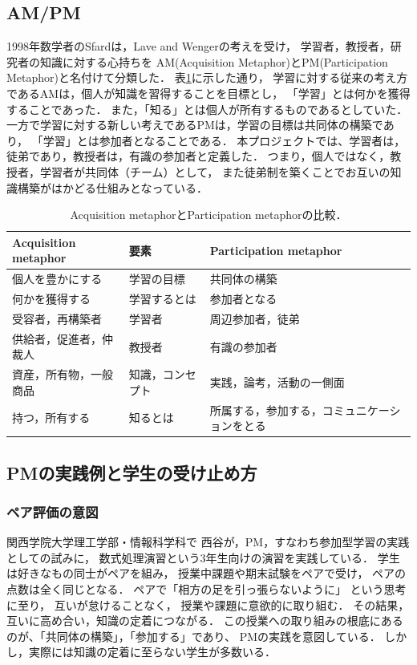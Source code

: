 \documentclass{hissymp}
\begin{document}
\subsection{AM/PM}
\label{sec:org652756e}
1998年数学者のSfardは，Lave and Wengerの考えを受け，
学習者，教授者，研究者の知識に対する心持ちを
AM(Acquisition Metaphor)とPM(Participation Metaphor)と名付けて分類した\cite{Sfard}．
表\ref{tab:org52578cd}に示した通り，
学習に対する従来の考え方であるAMは，個人が知識を習得することを目標とし，
「学習」とは何かを獲得することであった．
また，「知る」とは個人が所有するものであるとしていた．
一方で学習に対する新しい考えであるPMは，学習の目標は共同体の構築であり，
「学習」とは参加者となることである．
本プロジェクトでは、学習者は，徒弟であり，教授者は，有識の参加者と定義した．
つまり，個人ではなく，教授者，学習者が共同体（チーム）として，
また徒弟制を築くことでお互いの知識構築がはかどる仕組みとなっている．

\begin{table}[bt]
\caption{\label{tab:org52578cd}
Acquisition metaphorとParticipation metaphorの比較．}
\centering
\begin{tabular}{lll}
\hline
Acquisition metaphor & 要素 & Participation metaphor\\
\hline
個人を豊かにする & 学習の目標 & 共同体の構築\\
何かを獲得する & 学習するとは & 参加者となる\\
受容者，再構築者 & 学習者 & 周辺参加者，徒弟\\
供給者，促進者，仲裁人 & 教授者 & 有識の参加者\\
資産，所有物，一般商品 & 知識，コンセプト & 実践，論考，活動の一側面\\
持つ，所有する & 知るとは & 所属する，参加する，コミュニケーションをとる\\
\hline
\end{tabular}
\end{table}

\subsection{PMの実践例と学生の受け止め方}
\label{sec:org1845e05}
\subsubsection{ペア評価の意図}
\label{sec:org0be39be}
関西学院大学理工学部・情報科学科で
西谷が，PM，すなわち参加型学習の実践としての試みに，
数式処理演習という3年生向けの演習を実践している．
学生は好きなもの同士がペアを組み，
授業中課題や期末試験をペアで受け，
ペアの点数は全く同じとなる．
ペアで「相方の足を引っ張らないように」
という思考に至り，
互いが怠けることなく，
授業や課題に意欲的に取り組む．
その結果，互いに高め合い，知識の定着につながる．
この授業への取り組みの根底にあるのが、「共同体の構築」，「参加する」であり、
PMの実践を意図している．
しかし，実際には知識の定着に至らない学生が多数いる．
\end{document}
